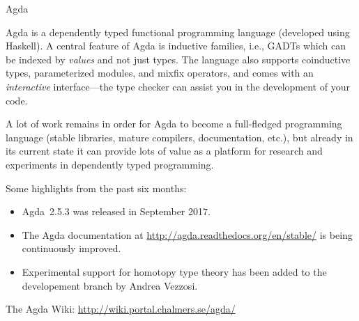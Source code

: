 \begin{hcarentry}[updated]{Agda}
\label{agda}
\makeheader

Agda is a dependently typed functional programming language (developed
using Haskell). A central feature of Agda is inductive families,
i.e., GADTs which can be indexed by \emph{values} and not just types.
The language also supports coinductive types, parameterized modules,
and mixfix operators, and comes with an \emph{interactive}
interface---the type checker can assist you in the development of your
code.

A lot of work remains in order for Agda to become a full-fledged
programming language (stable libraries, mature compilers, documentation,
etc.), but already in its current state it can provide lots of value as a
platform for research and experiments in dependently typed programming.

Some highlights from the past six months:
\begin{itemize}
\item Agda~2.5.3 was released in September 2017.
\item The Agda documentation at
\url{http://agda.readthedocs.org/en/stable/} is being continuously improved.
\item Experimental support for homotopy type theory has been added to the
developement branch by Andrea Vezzosi.
\end{itemize}

\FurtherReading
  The Agda Wiki: \url{http://wiki.portal.chalmers.se/agda/}
\end{hcarentry}

